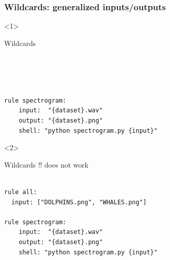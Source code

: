 \documentclass{beamer}
\begin{document}
                
\begin{frame}[fragile]
\frametitle{Wildcards: generalized inputs/outputs}
\small
{}
\begin{center}
    \begin{minipage}{11cm}
        \begin{onlyenv}<1>            
            \begin{block}{Wildcards}
                \begin{lstlisting}[basicstyle=\large]
            
            
       
  
rule spectrogram:
    input:  "{dataset}.wav"
    output: "{dataset}.png"
    shell: "python spectrogram.py {input}"  
                  \end{lstlisting}    
               \end{block}

            \end{onlyenv}        
    
    \begin{onlyenv}<2>   
        \begin{alertblock}{Wildcards !! does not work}
            \begin{lstlisting}[basicstyle=\large]            
            
rule all:
  input: ["DOLPHINS.png", "WHALES.png"]
  
rule spectrogram:
    input:  "{dataset}.wav"
    output: "{dataset}.png"
    shell: "python spectrogram.py {input}"  

    \end{lstlisting}    
        \end{alertblock}
             \end{onlyenv}


\end{minipage}
\end{center}
\end{frame}
\end{document}

